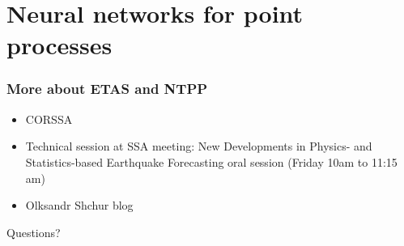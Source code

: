 \documentclass{beamer}
\begin{document}
	\section{Neural networks for point processes}

	\begin{frame}
		\frametitle{More about ETAS and NTPP}
		\begin{itemize}
			\item CORSSA
			\item Technical session at SSA meeting: New Developments in Physics- and Statistics-based Earthquake Forecasting oral session (Friday 10am to 11:15 am)
			\item Olksandr Shchur blog
		\end{itemize}
	\end{frame}
		
	\begin{frame}
		\begin{Huge}
			\begin{center}
				Questions?
			\end{center}
		\end{Huge}
	\end{frame}
			
\end{document}
